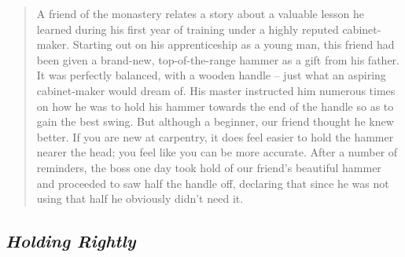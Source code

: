 \begin{quote}
A friend of the monastery relates a story about a valuable lesson he
learned during his first year of training under a highly reputed
cabinet-maker. Starting out on his apprenticeship as a young man, this
friend had been given a brand-new, top-of-the-range hammer as a gift
from his father. It was perfectly balanced, with a wooden handle -- just
what an aspiring cabinet-maker would dream of. His master instructed him
numerous times on how he was to hold his hammer towards the end of the
handle so as to gain the best swing. But although a beginner, our friend
thought he knew better. If you are new at carpentry, it does feel easier
to hold the hammer nearer the head; you feel like you can be more
accurate. After a number of reminders, the boss one day took hold of our
friend's beautiful hammer and proceeded to saw half the handle off,
declaring that since he was not using that half he obviously didn't need
it.
\end{quote}

\hypertarget{holding-rightly}{%
\subsection{\texorpdfstring{\emph{Holding
Rightly}}{Holding Rightly}}\label{holding-rightly}}

